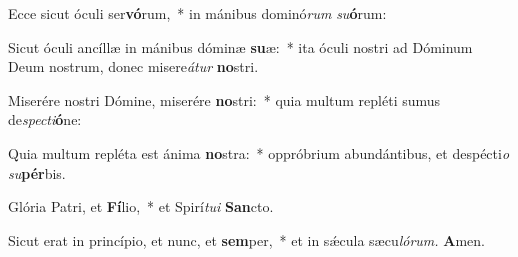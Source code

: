 \item Ecce sicut óculi ser\textbf{vó}rum,~* in mánibus dominó\textit{rum} \textit{su}\textbf{ó}rum:
\item Sicut óculi ancíllæ in mánibus dóminæ \textbf{su}æ:~* ita óculi nostri ad Dóminum Deum nostrum, donec misere\tinyhspace\textit{átur} \textbf{no}stri.
\item Miserére nostri Dómine, miserére \textbf{no}stri:~* quia multum repléti sumus de\tinyhspace\textit{specti}\textbf{ó}ne:
\item Quia multum repléta est ánima \textbf{no}stra:~* oppróbrium abundántibus, et despécti\textit{o} \textit{su}\textbf{pér}bis.
\item Glória Patri, et \textbf{Fí}lio,~* et Spirí\tinyhspace\textit{tu}\textit{i} \textbf{San}cto.
\item Sicut erat in princípio, et nunc, et \textbf{sem}per,~* et in sǽcula sæcu\tinyhspace\textit{lórum.} \textbf{A}men.
